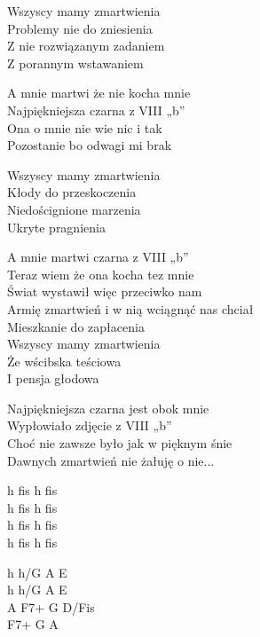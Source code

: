 \begin{text}
Wszyscy mamy zmartwienia\\
Problemy nie do zniesienia\\
Z nie rozwiązanym zadaniem\\
Z porannym wstawaniem

A mnie martwi że nie kocha mnie\\
Najpiękniejsza czarna z VIII „b”\\
Ona o mnie nie wie nic i tak\\
Pozostanie bo odwagi mi brak

Wszyscy mamy zmartwienia\\
Kłody do przeskoczenia\\
Niedoścignione marzenia\\
Ukryte pragnienia

A mnie martwi  czarna z VIII „b”\\
Teraz wiem że ona kocha tez mnie\\
Świat wystawił więc przeciwko nam\\
Armię zmartwień i w nią wciągnąć nas chciał\\

Mieszkanie do zapłacenia\\
Wszyscy mamy zmartwienia\\
Że wścibska teściowa\\
I pensja głodowa

Najpiękniejsza czarna jest obok mnie\\
Wypłowiało zdjęcie z VIII „b”\\
Choć nie zawsze było jak w pięknym śnie\\
Dawnych zmartwień nie żałuję o nie...
\end{text}
\begin{chord}
h fis h fis\\
h fis h fis\\
h fis h fis\\
h fis h fis

h h/G A E\\
h h/G A E\\
A F7+ G D/Fis\\
F7+ G A 
\end{chord}